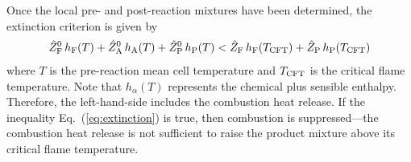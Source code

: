 \begin{enumerate}
Once the local pre- and post-reaction mixtures have been determined, the extinction criterion is given by
\begin{align}
\label{eq:extinction}
\hat{Z}_{\rm F}^0 \, h_{\rm F}(T) + \hat{Z}_{\rm A}^0 \, h_{\rm A}(T) + \hat{Z}_{\rm P}^0 \, h_{\rm P}(T) <
\hat{Z}_{\rm F} \, h_{\rm F}(T_{\rm CFT}) + \hat{Z}_{\rm P} \, h_{\rm P}(T_{\rm CFT})
\end{align}
where $T$ is the pre-reaction mean cell temperature and $T_{\rm CFT}$ is the critical flame temperature. Note that $h_\alpha(T)$ represents the chemical plus sensible enthalpy.  Therefore, the left-hand-side includes the combustion heat release.  If the inequality Eq.~(\ref{eq:extinction}) is true, then combustion is suppressed---the combustion heat release is not sufficient to raise the product mixture above its critical flame temperature.

\end{enumerate}

%
%
%

